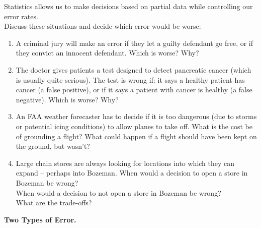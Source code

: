 Statistics allows us to make decisions based on partial data  while
controlling our error rates.\\
Discuss these situations and decide which error would be worse:\vspace{-.6cm}
\begin{enumerate}
\item A criminal jury will make an error if
      they let a guilty defendant go free, or if
      they convict an innocent defendant.
     Which is worse? Why?
\begin{students}
  \vspace{1.5cm}
\end{students}

\item The doctor gives patients a test designed to detect pancreatic
  cancer (which is usually quite serious).  The test is wrong if:
  it says a healthy patient has cancer (a false positive), or if
  it says a patient with cancer is healthy (a false negative).  Which
  is worse?  Why? 
\begin{students}
  \vspace{1.5cm}
\end{students}

\item  An FAA weather forecaster has to decide if it is too dangerous
   (due to storms or potential icing conditions) to allow planes to
   take off.  What is the cost be of grounding a flight? What could
   happen if a flight should have been kept on the ground, but wasn't?  
\begin{students}
  \vspace{2.5cm}
\end{students}



\item  Large chain stores are always looking for locations into which
  they can expand -- perhaps into Bozeman. 
  When would a  decision to open a store in Bozeman  be wrong?\\
  When would a decision to not open a store in Bozeman  be
  wrong?\\
  What are the trade-offs?  
\begin{students}
  \vspace{3cm}
\end{students}

\end{enumerate}

{\bf Two Types of Error. }

